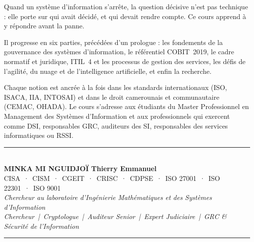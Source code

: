 \documentclass[12pt, twoside, openright, a4paper]{book}
\begin{document}
\begin{center}
\begin{minipage}{0.75\textwidth}
\color{white!85!gray}
Quand un système d'information s'arrête, la question décisive n'est pas
technique : elle porte sur qui avait décidé, et qui devait rendre compte.
Ce cours apprend à y répondre avant la panne.

\medskip

Il progresse en six parties, précédées d'un prologue : les fondements de la
gouvernance des systèmes d'information, le référentiel COBIT~2019, le cadre
normatif et juridique, ITIL~4 et les processus de gestion des services, les
défis de l'agilité, du nuage et de l'intelligence artificielle, et enfin la
recherche.

\medskip

Chaque notion est ancrée à la fois dans les standards internationaux (ISO,
ISACA, IIA, INTOSAI) et dans le droit camerounais et communautaire (CEMAC,
OHADA). Le cours s'adresse aux étudiants du Master Professionnel en
Management des Systèmes d'Information et aux professionnels qui exercent comme
DSI, responsables GRC, auditeurs des SI, responsables des services
informatiques ou RSSI.
\end{minipage}
\end{center}

\vfill

\begin{center}
    {\color{CouleurAccent}\rule{0.7\linewidth}{1.2pt}}\\[1.2ex]
    {\color{white}\large\bfseries MINKA MI NGUIDJOÏ Thierry Emmanuel}\\[0.4ex]
    {\color{white!80!gray}\small
        CISA~·~CISM~·~CGEIT~·~CRISC~·~CDPSE~·~ISO 27001~·~ISO 22301~·~ISO 9001}\\[0.3ex]
    {\color{white!70!gray}\footnotesize\itshape
        Chercheur au laboratoire d'Ingénierie Mathématiques et des Systèmes d'Information}\\[0.3ex]
    {\color{white!70!gray}\footnotesize\itshape
        Chercheur~|~Cryptologue~|~Auditeur Senior~|~Expert Judiciaire~|~GRC \& Sécurité de l'Information}\\[1.2ex]
    {\color{CouleurAccent}\rule{0.7\linewidth}{1.2pt}}
\end{center}

\vspace{1cm}

\afterpage{\nopagecolor}
\end{document}
